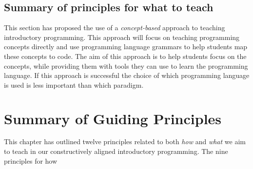 

\subsection{Summary of principles for what to teach} %
\label{ssub:summary_of_principles_for_what_to_teach}

This section has proposed the use of a \emph{concept-based} approach to teaching introductory programming. This approach will focus on teaching programming concepts directly and use programming language grammars to help students map these concepts to code. The aim of this approach is to help students focus on the concepts, while providing them with tools they can use to learn the programming language. If this approach is successful the choice of which programming language is used is less important than which paradigm. 


\clearpage
\section{Summary of Guiding Principles} %
\label{sec:summary_of_guiding_principles}

This chapter has outlined twelve principles related to both \emph{how} and \emph{what} we aim to teach in our constructively aligned introductory programming. The nine principles for how 

